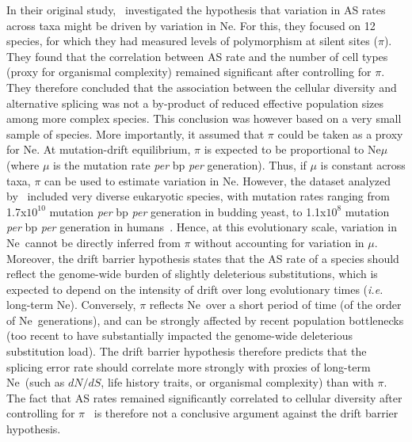 In their original study,~\citet{chen_correcting_2014} investigated the hypothesis that variation in AS rates across taxa might be driven by variation in \acrshort{Ne}. For this, they focused on 12 species, for which they had measured levels of polymorphism at silent sites ($\pi$). They found that the correlation between AS rate and the number of cell types (proxy for organismal complexity) remained significant after controlling for $\pi$. They therefore concluded that the association between the cellular diversity and alternative splicing was not a by-product of reduced effective population sizes among more complex species. This conclusion was however based on a very small sample of species. More importantly, it assumed that $\pi$ could be taken as a proxy for \acrshort{Ne}. At mutation-drift equilibrium, $\pi$ is expected to be proportional to \acrshort{Ne}$\mu$ (where $\mu$ is the mutation rate \textit{per} bp \textit{per} generation). Thus, if $\mu$ is constant across taxa, $\pi$ can be used to estimate variation in \acrshort{Ne}. However, the dataset analyzed by~\citet{chen_correcting_2014} included very diverse eukaryotic species, with mutation rates ranging from 1.7x$10^{10}$ mutation \textit{per} bp \textit{per} generation in budding yeast, to 1.1x$10^{8}$ mutation \textit{per} bp \textit{per} generation in humans~\citep{lynch_genetic_2016}. Hence, at this evolutionary scale, variation in \acrshort{Ne}~cannot be directly inferred from $\pi$ without accounting for variation in $\mu$. Moreover, the drift barrier hypothesis states that the AS rate of a species should reflect the genome-wide burden of slightly deleterious \gls{substitution}s, which is expected to depend on the intensity of drift over long evolutionary times (\textit{i.e.} long-term \acrshort{Ne}). Conversely, $\pi$ reflects \acrshort{Ne}~over a short period of time (of the order of \acrshort{Ne}~generations), and can be strongly affected by recent population bottlenecks (too recent to have substantially impacted the genome-wide deleterious substitution load). The drift barrier hypothesis therefore predicts that the splicing error rate should correlate more strongly with proxies of long-term \acrshort{Ne}~(such as ${dN}/{dS}$, life history traits, or organismal complexity) than with $\pi$. The fact that AS rates remained significantly correlated to cellular diversity after controlling for $\pi$~\citep{chen_correcting_2014} is therefore not a conclusive argument against the drift barrier hypothesis.
 
